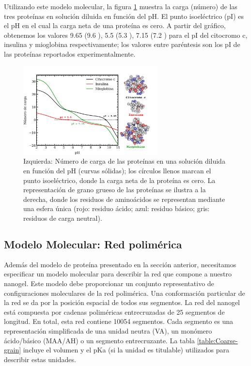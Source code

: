 Utilizando este modelo molecular, la figura \ref{fig:esf:protein-charge} muestra la carga (n\'umero) de las tres prote\'inas en soluci\'on diluida en funci\'on del pH.
El punto isoel\'ectrico (pI) es el pH en el cual la carga neta de una prote\'ina es cero.
A partir del gr\'afico, obtenemos los valores 9.65 (9.6 \cite{hristova2019isoelectric}), 5.5 (5.3 \cite{guckeisen2019isoelectric}), 7.15 (7.2 \cite{batys2020myoglobin}) para el pI del citocromo c, insulina y mioglobina respectivamente;
los valores entre par\'entesis son los pI de las prote\'inas reportados experimentalmente.


 \begin{figure}[!htb]
     \centering
     \includegraphics[width=0.65\textwidth]{Figures/graphs-gel2/protein-model.pdf}
     \caption{Izquierda: N\'umero de carga de las prote\'inas en una soluci\'on diluida en funci\'on del pH (curvas s\'olidas);
     	los c\'irculos llenos marcan el punto isoel\'ectrico,
     	donde la carga neta de la prote\'ina es cero.
     	La representaci\'on de grano grueso de las prote\'inas se ilustra a la derecha, donde los residuos de amino\'acidos se representan mediante una esfera \'unica (rojo: residuo \'acido; azul: residuo b\'asico; gris: residuos de carga neutral).}
     \label{fig:esf:protein-charge}
 \end{figure}



\subsection{Modelo Molecular: Red polim\'erica}

Adem\'as del modelo de prote\'ina presentado en la secci\'on anterior, necesitamos especificar un modelo molecular para describir la red que compone a nuestro nanogel. Este modelo debe proporcionar un conjunto representativo de configuraciones moleculares de la red polim\'erica. Una conformaci\'on particular de la red se da por la posici\'on espacial de todos sus segmentos.
La red del nanogel est\'a compuesta por cadenas polim\'ericas entrecruzadas de 25 segmentos de longitud. En total, esta red contiene 10054 segmentos. Cada segmento es una representaci\'on simplificada de una unidad neutra (VA), un mon\'omero \'acido/b\'asico (MAA/AH) o un segmento entrecruzante. La tabla \ref{table:Coarse-grain} incluye el volumen y el pKa (si la unidad es titulable) utilizados para describir estas unidades.

